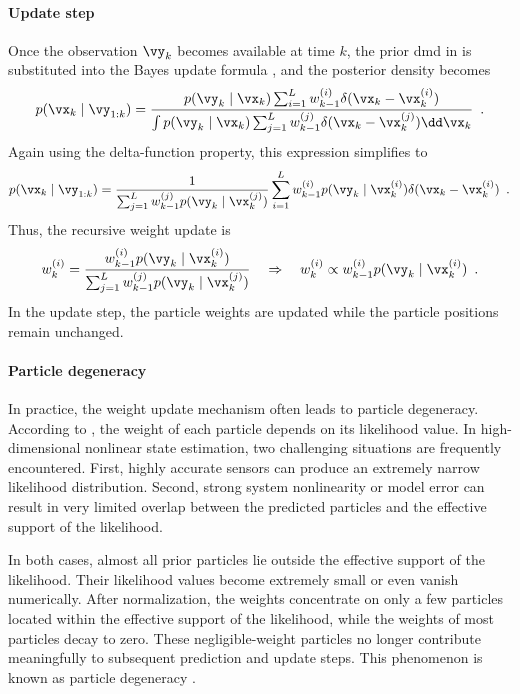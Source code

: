 \paragraph{Update step}

Once the observation $\vy_k$ becomes available at time $k$, the prior \ac{dmd} in  is substituted into the Bayes update formula , and the posterior density becomes
\begin{equation}
	p(\vx_k \mid \vy_{1:k}) = \frac{p(\vy_k \mid \vx_k) \sum_{i=1}^L w_{k-1}^{(i)} \delta(\vx_k - \vx_k^{(i)})}{\int p(\vy_k \mid \vx_k) \sum_{j=1}^L w_{k-1}^{(j)} \delta(\vx_k - \vx_k^{(j)}) \dd\vx_k} \enspace.
\end{equation}
Again using the delta-function property, this expression simplifies to
\begin{equation}
	p(\vx_k \mid \vy_{1:k}) = \frac{1}{\sum_{j=1}^L w_{k-1}^{(j)} p(\vy_k \mid \vx_k^{(j)})} \sum_{i=1}^L w_{k-1}^{(i)} p(\vy_k \mid \vx_k^{(i)}) \delta(\vx_k - \vx_k^{(i)}) \enspace.
\end{equation}
Thus, the recursive weight update is
\begin{equation}
	w_k^{(i)} = \frac{w_{k-1}^{(i)} p(\vy_k \mid \vx_k^{(i)})}{\sum_{j=1}^L w_{k-1}^{(j)} p(\vy_k \mid \vx_k^{(j)})}
	\quad \Rightarrow \quad
	w_k^{(i)} \propto w_{k-1}^{(i)} p(\vy_k \mid \vx_k^{(i)})\enspace.
	\label{eq:weight_update_rule}
\end{equation}
In the update step, the particle weights are updated while the particle positions remain unchanged.

\paragraph{Particle degeneracy}

In practice, the weight update mechanism often leads to particle degeneracy. According to , the weight of each particle depends on its likelihood value. In high-dimensional nonlinear state estimation, two challenging situations are frequently encountered. First, highly accurate sensors can produce an extremely narrow likelihood distribution. Second, strong system nonlinearity or model error can result in very limited overlap between the predicted particles and the effective support of the likelihood.

In both cases, almost all prior particles lie outside the effective support of the likelihood. Their likelihood values become extremely small or even vanish numerically. After normalization, the weights concentrate on only a few particles located within the effective support of the likelihood, while the weights of most particles decay to zero. These negligible-weight particles no longer contribute meaningfully to subsequent prediction and update steps. This phenomenon is known as particle degeneracy \cite{PF02}.

